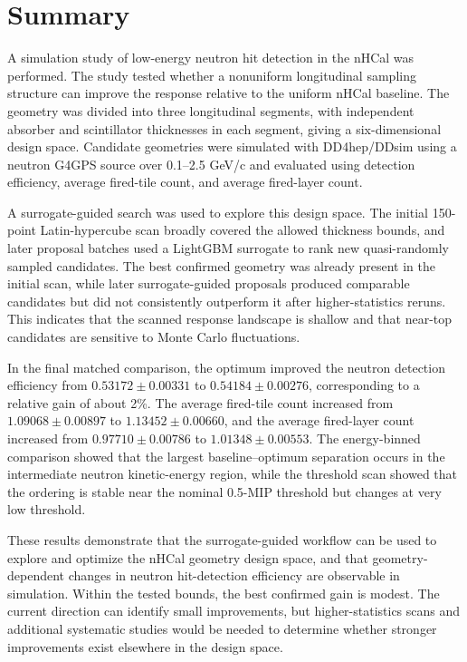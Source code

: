 \section{Summary}\label{sec:summary}

\noindent A simulation study of low-energy neutron hit detection in the nHCal was performed. The study tested whether a nonuniform longitudinal sampling structure can improve the response relative to the uniform nHCal baseline. The geometry was divided into three longitudinal segments, with independent absorber and scintillator thicknesses in each segment, giving a six-dimensional design space. Candidate geometries were simulated with DD4hep/DDsim using a neutron G4GPS source over 0.1--2.5 GeV/c and evaluated using detection efficiency, average fired-tile count, and average fired-layer count.

\noindent A surrogate-guided search was used to explore this design space. The initial 150-point Latin-hypercube scan broadly covered the allowed thickness bounds, and later proposal batches used a LightGBM surrogate to rank new quasi-randomly sampled candidates. The best confirmed geometry was already present in the initial scan, while later surrogate-guided proposals produced comparable candidates but did not consistently outperform it after higher-statistics reruns. This indicates that the scanned response landscape is shallow and that near-top candidates are sensitive to Monte Carlo fluctuations.

\noindent In the final matched comparison, the optimum improved the neutron detection efficiency from $0.53172 \pm 0.00331$ to $0.54184 \pm 0.00276$, corresponding to a relative gain of about 2\%. The average fired-tile count increased from $1.09068 \pm 0.00897$ to $1.13452 \pm 0.00660$, and the average fired-layer count increased from $0.97710 \pm 0.00786$ to $1.01348 \pm 0.00553$. The energy-binned comparison showed that the largest baseline--optimum separation occurs in the intermediate neutron kinetic-energy region, while the threshold scan showed that the ordering is stable near the nominal 0.5-MIP threshold but changes at very low threshold.

\noindent These results demonstrate that the surrogate-guided workflow can be used to explore and optimize the nHCal geometry design space, and that geometry-dependent changes in neutron hit-detection efficiency are observable in simulation. Within the tested bounds, the best confirmed gain is modest. The current direction can identify small improvements, but higher-statistics scans and additional systematic studies would be needed to determine whether stronger improvements exist elsewhere in the design space.
